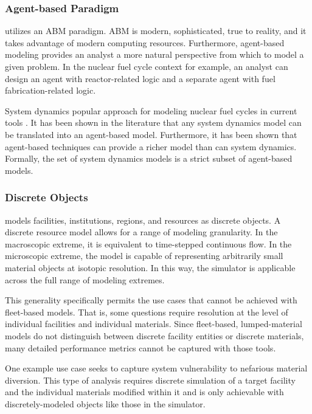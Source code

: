 \subsubsection{Agent-based Paradigm}

\Cyclus utilizes an \gls{ABM} paradigm.  \gls{ABM} is modern, sophisticated, 
true to reality, and it takes advantage of modern computing resources. 
Furthermore, agent-based modeling provides an analyst a more natural 
perspective from which to model a given problem. In the nuclear fuel cycle 
context for example, an analyst can design an agent with reactor-related logic 
and a separate agent with fuel fabrication-related logic.  

System dynamics popular approach for modeling nuclear fuel cycles in current
tools \cite{VISION,CAFCA}. It has been shown in the literature
\cite{macal_agent-based_2010} that any system dynamics model can be translated
into an agent-based model. Furthermore, it has been shown that agent-based
techniques can provide a richer model than can system dynamics. Formally, the
set of system dynamics models is a strict subset of agent-based models.



\subsubsection{Discrete Objects}

\Cyclus models facilities, institutions, regions, and resources as discrete 
objects. A discrete resource model allows for a range of modeling granularity. In the
macroscopic extreme, it is equivalent to time-stepped continuous flow. In the
microscopic extreme, the model is capable of representing arbitrarily small 
material objects at isotopic resolution. In this way, the \Cyclus simulator is 
applicable across the full range of modeling extremes. 

This generality specifically permits the use cases that cannot be achieved with 
fleet-based models. That is, some questions require resolution at the level of 
individual facilities and individual materials.  Since fleet-based, 
lumped-material models do not distinguish between discrete facility entities or 
discrete materials, many detailed performance metrics cannot be captured with 
those tools. 

One example use case seeks to capture system vulnerability to nefarious 
material diversion. This type of analysis requires discrete simulation of a 
target facility and the individual materials modified within it and is only 
achievable with discretely-modeled objects like those in the \Cyclus simulator. 

